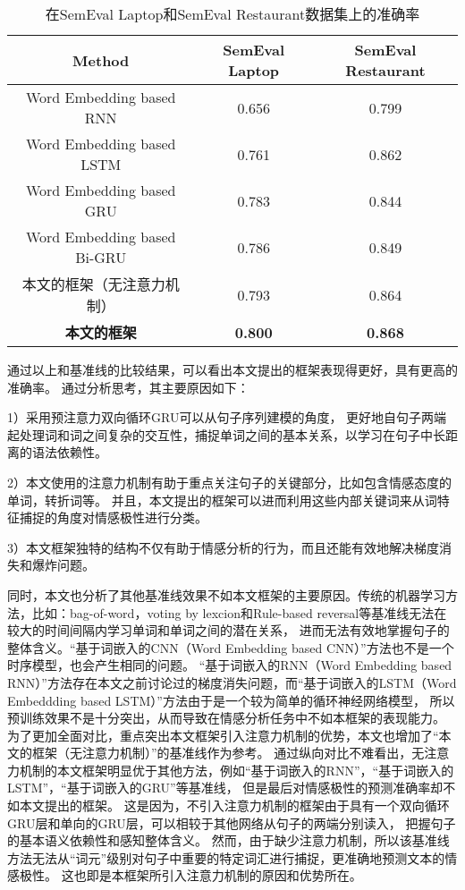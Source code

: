 \begin{table}
    \centering
    \caption{在SemEval Laptop和SemEval Restaurant数据集上的准确率}
    \label{Table:Table3}
    \begin{tabular}{@{}ccc@{}}
        \hline
        Method & SemEval Laptop & SemEval Restaurant \\ \hline
        Word Embedding based RNN & 0.656 & 0.799              \\
        Word Embedding based LSTM & 0.761 & 0.862              \\
        Word Embedding based GRU & 0.783 & 0.844              \\
        Word Embedding based Bi-GRU & 0.786 & 0.849              \\
        本文的框架（无注意力机制） & 0.793 & 0.864              \\
        \textbf{本文的框架}       & \textbf{0.800} & \textbf{0.868}     \\ \hline
    \end{tabular}
\end{table}

通过以上和基准线的比较结果，可以看出本文提出的框架表现得更好，具有更高的准确率。
通过分析思考，其主要原因如下：

1）采用预注意力双向循环GRU可以从句子序列建模的角度，
更好地自句子两端起处理词和词之间复杂的交互性，捕捉单词之间的基本关系，以学习在句子中长距离的语法依赖性。

2）本文使用的注意力机制有助于重点关注句子的关键部分，比如包含情感态度的单词，转折词等。
并且，本文提出的框架可以进而利用这些内部关键词来从词特征捕捉的角度对情感极性进行分类。

3）本文框架独特的结构不仅有助于情感分析的行为，而且还能有效地解决梯度消失和爆炸问题。

同时，本文也分析了其他基准线效果不如本文框架的主要原因。传统的机器学习方法，比如：bag-of-word，voting by lexcion和Rule-based reversal等基准线无法在较大的时间间隔内学习单词和单词之间的潜在关系，
进而无法有效地掌握句子的整体含义。“基于词嵌入的CNN（Word Embedding based CNN）”方法也不是一个时序模型，也会产生相同的问题。
“基于词嵌入的RNN（Word Embedding based RNN）”方法存在本文之前讨论过的梯度消失问题，而“基于词嵌入的LSTM（Word Embeddding based LSTM）”方法由于是一个较为简单的循环神经网络模型，
所以预训练效果不是十分突出，从而导致在情感分析任务中不如本框架的表现能力。
为了更加全面对比，重点突出本文框架引入注意力机制的优势，本文也增加了“本文的框架（无注意力机制）”的基准线作为参考。
通过纵向对比不难看出，无注意力机制的本文框架明显优于其他方法，例如“基于词嵌入的RNN”，“基于词嵌入的LSTM”，“基于词嵌入的GRU”等基准线，
但是最后对情感极性的预测准确率却不如本文提出的框架。
这是因为，不引入注意力机制的框架由于具有一个双向循环GRU层和单向的GRU层，可以相较于其他网络从句子的两端分别读入，
把握句子的基本语义依赖性和感知整体含义。
然而，由于缺少注意力机制，所以该基准线方法无法从“词元”级别对句子中重要的特定词汇进行捕捉，更准确地预测文本的情感极性。
这也即是本框架所引入注意力机制的原因和优势所在。

